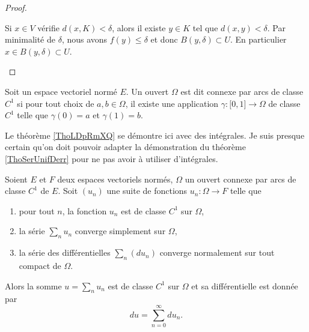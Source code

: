 \begin{proof}
\begin{subproof}
        Si \( x\in V\) vérifie \( d(x,K)<\delta\), alors il existe \( y\in K\) tel que \( d(x,y)<\delta\). Par minimalité de \( \delta\), nous avons \( f(y)\leq \delta\) et donc \( B(y,\delta)\subset U\). En particulier \( x\in B(y,\delta)\subset U\).
    \end{subproof}
\end{proof}

\begin{definition}      \label{DEFooHOXOooKUqTQU}
	Soit un espace vectoriel normé \( E\). Un ouvert \( \Omega\) est dit connexe par arcs de classe \( C^1\) si pour tout choix de \( a,b\in \Omega\), il existe une application \( \gamma\colon \mathopen[ 0 , 1 \mathclose]\to \Omega\) de classe \( C^1\) telle que \( \gamma(0)=a\) et \( \gamma(1)=b\).
\end{definition}

\begin{probleme}
	Le théorème \ref{ThoLDpRmXQ} se démontre ici avec des intégrales. Je suis presque certain qu'on doit pouvoir adapter la démonstration du théorème \ref{ThoSerUnifDerr} pour ne pas avoir à utiliser d'intégrales.
\end{probleme}

\begin{theorem} \label{ThoLDpRmXQ}
	Soient \( E\) et \( F\) deux espaces vectoriels normés, \( \Omega\) un ouvert connexe par arcs de classe \( C^1\) de \( E\). Soit \( (u_n)\) une suite de fonctions \( u_n\colon \Omega\to F\) telle que
	\begin{enumerate}
		\item
		      pour tout \( n\), la fonction \( u_n\) est de classe \( C^1\) sur \( \Omega\),
		\item
		      la série \( \sum_nu_n\) converge simplement sur \( \Omega\),
		\item
		      la série des différentielles \( \sum_n(du_n)\) converge normalement sur tout compact de \( \Omega\).
	\end{enumerate}
	Alors la somme \( u=\sum_nu_n\) est de classe \( C^1\) sur \( \Omega\) et sa différentielle est donnée par
	\begin{equation}
		du=\sum_{n=0}^{\infty}du_n.
	\end{equation}
\end{theorem}

